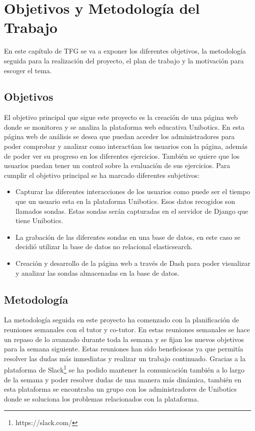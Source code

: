 \chapter{Objetivos y Metodología del Trabajo}\label{objetivos}

En este capítulo de TFG se va a exponer los diferentes objetivos, la metodología seguida para la realización del proyecto, el plan de trabajo y la motivación para escoger el tema.


\section{Objetivos}

El objetivo principal que sigue este proyecto es la creación de una página web donde se monitorea y se analiza la plataforma web educativa Unibotics. En esta página web de análisis se desea que puedan acceder los administradores para poder comprobar y analizar como interactúan los usuarios con la página, además de poder ver su progreso en los diferentes ejercicios. También se quiere que los usuarios puedan tener un control sobre la evaluación de sus ejercicios. Para cumplir el objetivo principal se ha marcado diferentes subjetivos:

\begin{itemize}
\item Capturar las diferentes interacciones de los usuarios como puede ser el tiempo que un usuario esta en la plataforma Unibotics. Esos datos recogidos son llamados sondas. Estas sondas serán capturadas en el servidor de Django que tiene Unibotics.

\item La grabación de las diferentes sondas en una base de datos, en este caso se decidió utilizar la base de datos no relacional elasticsearch.

\item Creación y desarrollo de la página web a través de Dash para poder visualizar y analizar las sondas almacenadas en la base de datos.
\end{itemize}

\newpage

 
\section{Metodología}

La metodología seguida en este proyecto ha comenzado con la planificación de reuniones semanales con el tutor y co-tutor. En estas reuniones semanales se hace un repaso de lo avanzado durante toda la semana y se fijan los nuevos objetivos para la semana siguiente. Estas reuniones han sido beneficiosas ya que permitía resolver las dudas más inmediatas y realizar un trabajo continuado. Gracias a la plataforma de Slack\footnote{https://slack.com/} se ha podido mantener la comunicación también a lo largo de la semana y poder resolver dudas de una manera más dinámica, también en esta plataforma se encontraba un grupo con los administradores de Unibotics donde se soluciona los problemas relacionados con la plataforma.\\

